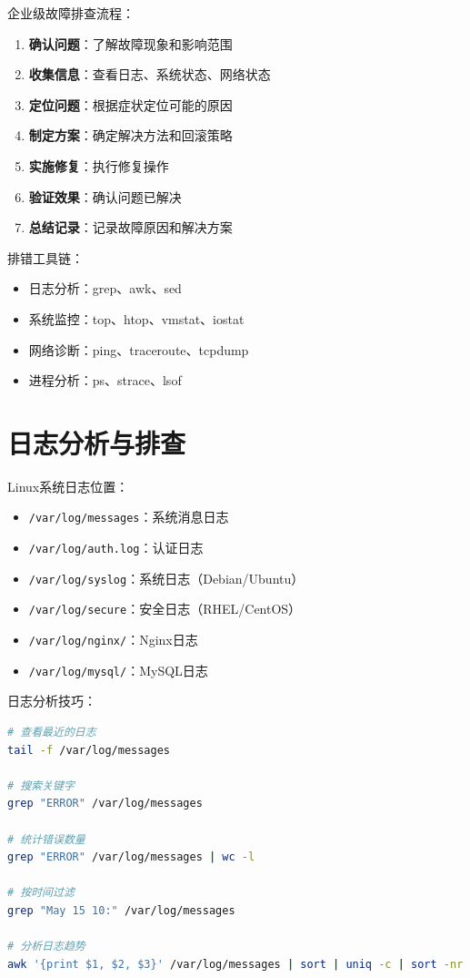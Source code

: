 \documentclass[12pt,UTF8]{ctexbook}
\begin{document}
企业级故障排查流程：

\begin{enumerate}
    \item \textbf{确认问题}：了解故障现象和影响范围
    \item \textbf{收集信息}：查看日志、系统状态、网络状态
    \item \textbf{定位问题}：根据症状定位可能的原因
    \item \textbf{制定方案}：确定解决方法和回滚策略
    \item \textbf{实施修复}：执行修复操作
    \item \textbf{验证效果}：确认问题已解决
    \item \textbf{总结记录}：记录故障原因和解决方案
\end{enumerate}

排错工具链：
\begin{itemize}
    \item 日志分析：grep、awk、sed
    \item 系统监控：top、htop、vmstat、iostat
    \item 网络诊断：ping、traceroute、tcpdump
    \item 进程分析：ps、strace、lsof
\end{itemize}

\section{日志分析与排查}
\label{sec:log-analysis}

Linux系统日志位置：
\begin{itemize}
    \item \texttt{/var/log/messages}：系统消息日志
    \item \texttt{/var/log/auth.log}：认证日志
    \item \texttt{/var/log/syslog}：系统日志（Debian/Ubuntu）
    \item \texttt{/var/log/secure}：安全日志（RHEL/CentOS）
    \item \texttt{/var/log/nginx/}：Nginx日志
    \item \texttt{/var/log/mysql/}：MySQL日志
\end{itemize}

日志分析技巧：
\begin{lstlisting}[language=bash]
# 查看最近的日志
tail -f /var/log/messages

# 搜索关键字
grep "ERROR" /var/log/messages

# 统计错误数量
grep "ERROR" /var/log/messages | wc -l

# 按时间过滤
grep "May 15 10:" /var/log/messages

# 分析日志趋势
awk '{print $1, $2, $3}' /var/log/messages | sort | uniq -c | sort -nr
\end{lstlisting}
\end{document}
